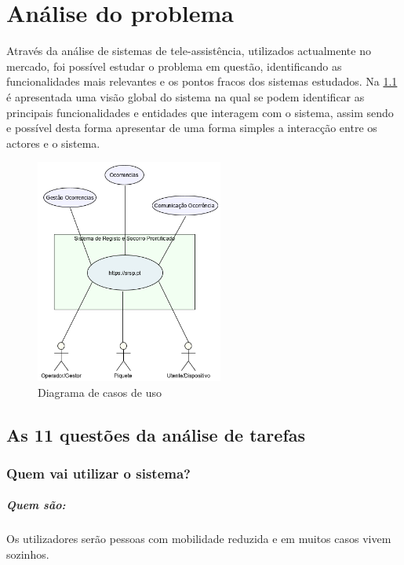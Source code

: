 \chapter{Análise do problema}
\label{cap2}

Através da análise de sistemas de tele-assistência, utilizados actualmente no mercado, foi possível estudar o problema em questão, identificando as funcionalidades mais relevantes e os pontos fracos dos sistemas estudados. Na \ref{fig:cenario_global} é apresentada uma visão global do sistema na qual se podem identificar as principais funcionalidades e entidades que interagem com o sistema, assim sendo e possível desta forma apresentar de uma forma simples a interacção entre os actores e o sistema.

\begin{figure}[!htb]
	\centering
	\includegraphics[width=0.55\textwidth]{figuras/cenario_global_sistema.png}
	\caption{Diagrama de casos de uso}
	\label{fig:cenario_global}
\end{figure}

\section{As 11 questões da análise de tarefas}

\subsection{Quem vai utilizar o sistema?}
\paragraph{Quem são:}Os utilizadores serão pessoas com mobilidade reduzida e em muitos casos vivem sozinhos.

